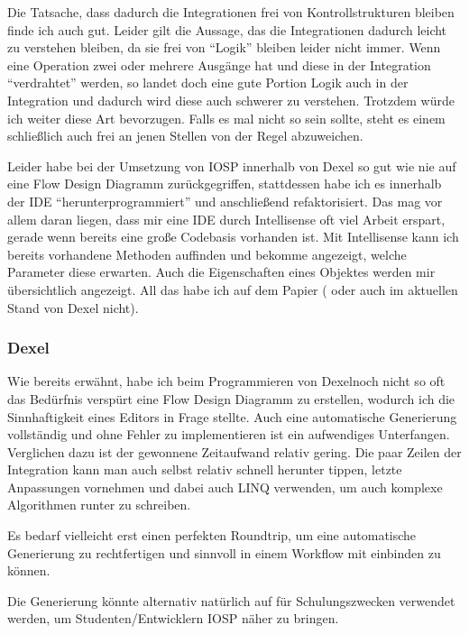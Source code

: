 Die Tatsache, dass dadurch die Integrationen frei von Kontrollstrukturen bleiben finde ich auch gut. 
Leider gilt die Aussage, das die Integrationen dadurch leicht zu verstehen bleiben, da sie frei von \enquote{Logik} bleiben leider nicht immer. Wenn eine Operation zwei oder mehrere Ausgänge hat und diese in der Integration \enquote{verdrahtet} werden, so landet doch eine gute Portion Logik auch in der Integration und dadurch wird diese auch schwerer zu verstehen. 
Trotzdem würde ich weiter diese Art bevorzugen. Falls es mal nicht so sein sollte, steht es einem schließlich auch frei an jenen Stellen von der Regel abzuweichen.


Leider habe bei der Umsetzung von IOSP innerhalb von Dexel so gut wie nie auf eine Flow Design Diagramm zurückgegriffen, stattdessen habe ich es innerhalb der IDE \enquote{herunterprogrammiert} und anschließend refaktorisiert. Das mag vor allem daran liegen, dass mir eine IDE durch Intellisense oft viel Arbeit erspart, gerade wenn bereits eine große Codebasis vorhanden ist.
Mit Intellisense kann ich bereits vorhandene Methoden auffinden und bekomme angezeigt, welche Parameter diese erwarten.
Auch die Eigenschaften eines Objektes werden mir übersichtlich angezeigt.
All das habe ich auf dem Papier ( oder auch im aktuellen Stand von Dexel nicht).



\subsubsection{Dexel}

Wie bereits erwähnt, habe ich beim Programmieren von Dexelnoch nicht so oft das Bedürfnis verspürt eine Flow Design Diagramm zu erstellen, wodurch ich die Sinnhaftigkeit eines Editors in Frage stellte.
Auch eine automatische Generierung  vollständig und ohne Fehler zu implementieren ist ein aufwendiges Unterfangen. Verglichen dazu ist der gewonnene Zeitaufwand  relativ gering. Die paar Zeilen der Integration kann man auch selbst relativ schnell herunter tippen, letzte Anpassungen vornehmen und dabei  auch LINQ  verwenden, um  auch komplexe Algorithmen runter zu schreiben.

 Es bedarf vielleicht erst einen perfekten Roundtrip, um eine automatische Generierung zu rechtfertigen und sinnvoll in einem Workflow mit einbinden zu können.
 
 Die Generierung könnte alternativ natürlich auf für Schulungszwecken verwendet werden, um Studenten/Entwicklern IOSP näher zu bringen.
 
